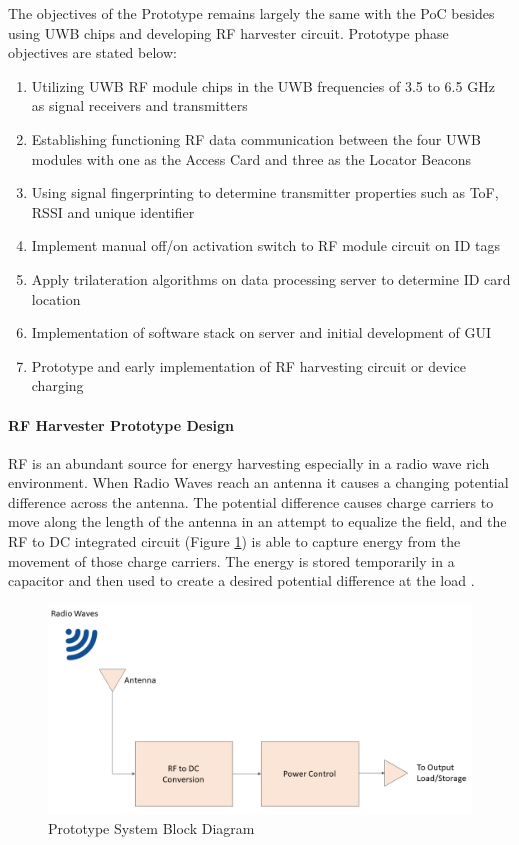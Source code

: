The objectives of the Prototype remains largely the same with the PoC besides using UWB
chips and developing RF harvester circuit. Prototype phase objectives are stated below:

\begin{enumerate}
    \item Utilizing UWB RF module chips in the UWB frequencies of 3.5 to 6.5 GHz as
    signal receivers and transmitters
    \item Establishing functioning RF data communication between the four UWB modules
    with one as the Access Card and three as the Locator Beacons
    \item Using signal fingerprinting to determine transmitter properties such as ToF,
    RSSI and unique identifier
    \item Implement manual off/on activation switch to RF module circuit on ID tags
    \item Apply trilateration algorithms on data processing server to determine
    ID card location
    \item Implementation of software stack on server and initial development of GUI
    \item Prototype and early implementation of  RF harvesting circuit or device charging
\end{enumerate}

\break
\paragraph{RF Harvester Prototype Design}
\bigskip
RF is an abundant source for energy harvesting especially in a radio wave rich environment. When Radio Waves reach an antenna it causes a changing potential difference across the antenna. The potential difference causes charge carriers to move along the length of the antenna in an attempt to equalize the field, and the RF to \Gls{DC} integrated circuit (Figure \ref{fig:rfh}) is able to capture energy from the movement of those charge carriers. The energy is stored temporarily in a capacitor and then used to create a desired potential difference at the load \cite{R5}.
\begin{figure}[h!]
    \centering
    \includegraphics[width=\linewidth]{./images/rf_harvest.png}
    \caption{Prototype System Block Diagram}
    \label{fig:rfh}
\end{figure}

